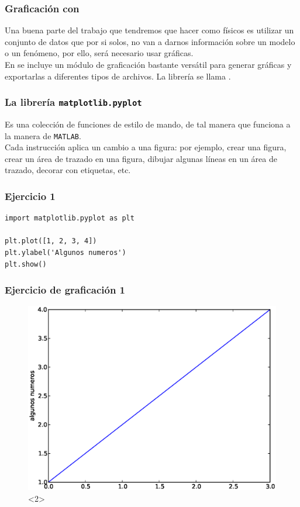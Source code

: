 \documentclass[12pt]{beamer}
\begin{document}
\begin{frame}
\frametitle{Graficación con \python}
Una buena parte del trabajo que tendremos que hacer como físicos es utilizar un conjunto de datos que por si solos, no van a darnos información sobre un modelo o un fenómeno, por ello, será necesario usar gráficas.
\\
\medskip
\pause
En \python{} se incluye un módulo de graficación bastante versátil para generar gráficas y exportarlas a diferentes tipos de archivos. \pause La librería se llama .
\end{frame}
\begin{frame}
\frametitle{La librería \texttt{matplotlib.pyplot}}
Es una colección de funciones de estilo de mando, de tal manera que  funciona a la manera de \texttt{MATLAB}.
\\
\bigskip
\pause
Cada instrucción  aplica un cambio a una figura: por ejemplo, crear una figura, crear un área de trazado en una figura, dibujar algunas líneas en un área de trazado, decorar con etiquetas, etc.
\end{frame}
\begin{frame}[fragile]
\frametitle{Ejercicio 1}
\begin{lstlisting}[caption=Primer ejercicio de graficación]
import matplotlib.pyplot as plt

plt.plot([1, 2, 3, 4])
plt.ylabel('Algunos numeros')
plt.show()
\end{lstlisting}
\end{frame}
\begin{frame}[fragile]
\frametitle{Ejercicio de graficación 1}
\begin{figure}
	\centering
	\includegraphics[scale=0.35]{Imagenes/plotEjercicio1.eps}<2> 
\end{figure}
\end{frame}
\end{document}

